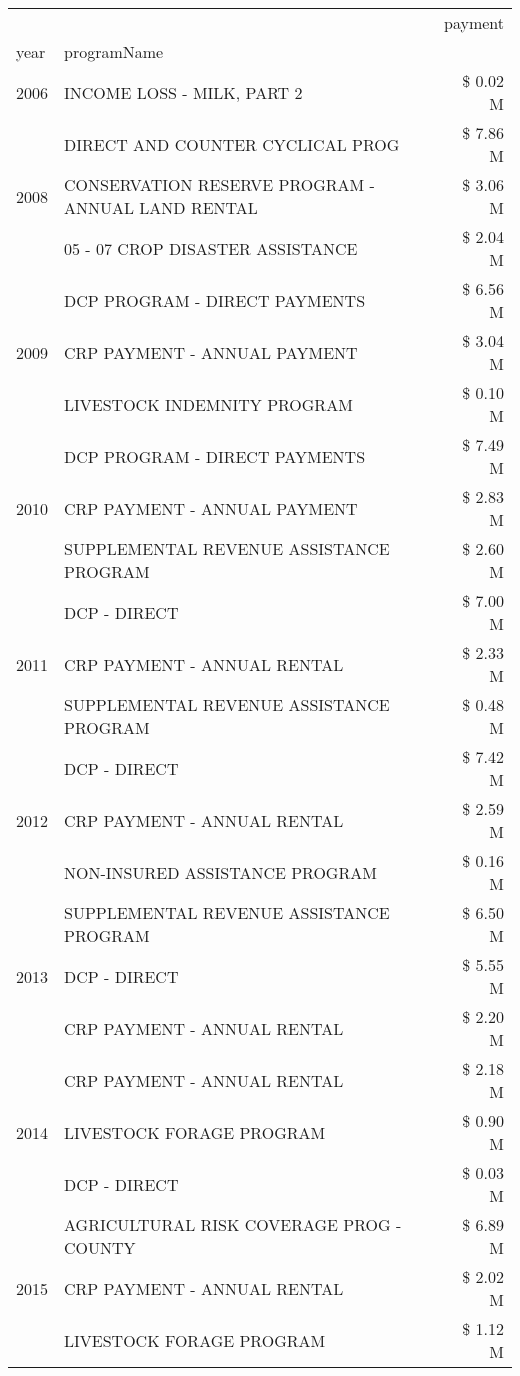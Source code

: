 \begin{tabular}{llr}
\toprule
 &  & payment \\
year & programName &  \\
\midrule
2006 & INCOME LOSS - MILK, PART 2 & \$ 0.02 M \\
\cline{1-3}
\multirow[t]{3}{*}{2008} & DIRECT AND COUNTER CYCLICAL PROG & \$ 7.86 M \\
 & CONSERVATION RESERVE PROGRAM - ANNUAL LAND RENTAL & \$ 3.06 M \\
 & 05 - 07 CROP DISASTER ASSISTANCE & \$ 2.04 M \\
\cline{1-3}
\multirow[t]{3}{*}{2009} & DCP PROGRAM - DIRECT PAYMENTS & \$ 6.56 M \\
 & CRP PAYMENT - ANNUAL PAYMENT & \$ 3.04 M \\
 & LIVESTOCK INDEMNITY PROGRAM & \$ 0.10 M \\
\cline{1-3}
\multirow[t]{3}{*}{2010} & DCP PROGRAM - DIRECT PAYMENTS & \$ 7.49 M \\
 & CRP PAYMENT - ANNUAL PAYMENT & \$ 2.83 M \\
 & SUPPLEMENTAL REVENUE ASSISTANCE PROGRAM & \$ 2.60 M \\
\cline{1-3}
\multirow[t]{3}{*}{2011} & DCP - DIRECT & \$ 7.00 M \\
 & CRP PAYMENT - ANNUAL RENTAL & \$ 2.33 M \\
 & SUPPLEMENTAL REVENUE ASSISTANCE PROGRAM & \$ 0.48 M \\
\cline{1-3}
\multirow[t]{3}{*}{2012} & DCP - DIRECT & \$ 7.42 M \\
 & CRP PAYMENT - ANNUAL RENTAL & \$ 2.59 M \\
 & NON-INSURED ASSISTANCE PROGRAM & \$ 0.16 M \\
\cline{1-3}
\multirow[t]{3}{*}{2013} & SUPPLEMENTAL REVENUE ASSISTANCE PROGRAM & \$ 6.50 M \\
 & DCP - DIRECT & \$ 5.55 M \\
 & CRP PAYMENT - ANNUAL RENTAL & \$ 2.20 M \\
\cline{1-3}
\multirow[t]{3}{*}{2014} & CRP PAYMENT - ANNUAL RENTAL & \$ 2.18 M \\
 & LIVESTOCK FORAGE PROGRAM & \$ 0.90 M \\
 & DCP - DIRECT & \$ 0.03 M \\
\cline{1-3}
\multirow[t]{3}{*}{2015} & AGRICULTURAL RISK COVERAGE PROG - COUNTY & \$ 6.89 M \\
 & CRP PAYMENT - ANNUAL RENTAL & \$ 2.02 M \\
 & LIVESTOCK FORAGE PROGRAM & \$ 1.12 M \\

\end{tabular}
